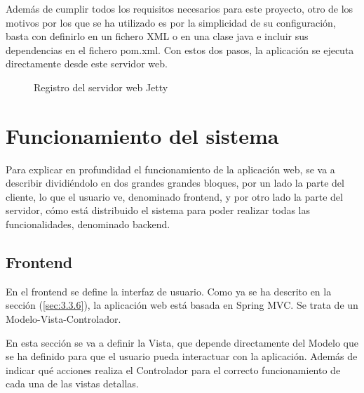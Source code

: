 Además de cumplir todos los requisitos necesarios para este proyecto, otro de los motivos por los que se ha utilizado es por la simplicidad de su configuración, basta con definirlo en un fichero XML o en una clase java e incluir sus dependencias en el fichero pom.xml. Con estos dos pasos, la aplicación se ejecuta directamente desde este servidor web.

\begin{figure}[H]
\centering
{
\setlength{\fboxsep}{0pt}
\setlength{\fboxrule}{1pt}
}
\caption{Registro del servidor web Jetty} \label{fig:log}
\end{figure}


\chapter{Funcionamiento del sistema}

Para explicar en profundidad el funcionamiento de la aplicación web, se va a describir dividiéndolo en dos grandes grandes bloques, por un lado la parte del cliente, lo que el usuario ve, denominado frontend, y por otro lado la parte del servidor, cómo está distribuido el sistema para poder realizar todas las funcionalidades, denominado backend.

\section{Frontend}
En el frontend se define la interfaz de usuario. Como ya se ha descrito en la sección (\ref{sec:3.3.6}), la aplicación web está basada en Spring MVC. Se trata de un Modelo-Vista-Controlador. 

En esta sección se va a definir la Vista, que depende directamente del Modelo que se ha definido para que el usuario pueda interactuar con la aplicación. Además de indicar qué acciones realiza el Controlador para el correcto funcionamiento de cada una de las vistas detallas.


